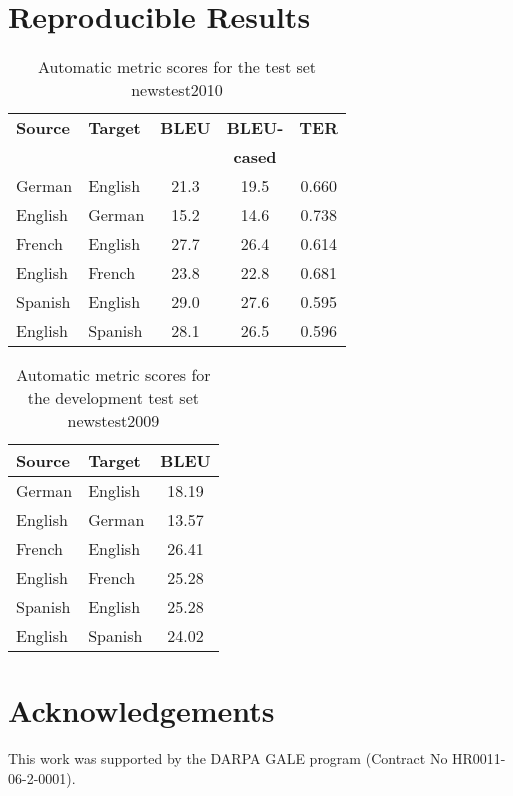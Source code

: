 \documentclass[11pt]{article}
\begin{document}
\section{Reproducible Results}
\label{Results}

\begin{table}[h]
\begin{center}
\begin{tabular}{|l|l||c|c|c|}
\hline
\bf Source & \bf Target & \bf BLEU & \bf BLEU- & \bf TER \\
& & & \bf cased & \\
\hline
German & English & 21.3 & 19.5 & 0.660 \\ \hline
English & German & 15.2  & 14.6  & 0.738 \\ \hline
French & English & 27.7 & 26.4 & 0.614 \\ \hline
English & French & 23.8 & 22.8 & 0.681 \\ \hline
Spanish & English & 29.0 & 27.6 & 0.595 \\ \hline
English & Spanish & 28.1 & 26.5 & 0.596  \\ \hline
\end{tabular}
\end{center}
\caption{\label{scores} Automatic metric scores for the test set newstest2010 }
\end{table}


\begin{table}[h]
\begin{center}
\begin{tabular}{|l|l||c|}
\hline
\bf Source & \bf Target & \bf BLEU  \\
\hline
German & English & 18.19  \\ \hline
English & German & 13.57 \\ \hline
French & English & 26.41 \\ \hline
English & French & 25.28 \\ \hline
Spanish & English & 25.28 \\ \hline
English & Spanish & 24.02  \\ \hline
\end{tabular}
\end{center}
\caption{\label{devtest-scores} Automatic metric scores for the development test set newstest2009}
\end{table}







\section*{Acknowledgements}
This work was supported by the DARPA GALE program (Contract No HR0011-06-2-0001).







\end{document}
